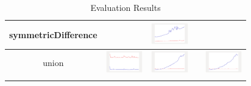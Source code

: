 \begin{longtable}{ c|c c c c}
symmetricDifference
&
&
\includegraphics[width=1.6cm]{../graphs/set/small/SymmetricDif}
&
&
\\\hline

union
&
\includegraphics[width=1.6cm]{../graphs/sequence/small/Union}
&
\includegraphics[width=1.6cm]{../graphs/set/small/Union}
&
&
\includegraphics[width=1.6cm]{../graphs/orderedset/small/Union}
\\\hline

\caption{Evaluation Results }
\label{tab:resultsFull}
\end{longtable}


